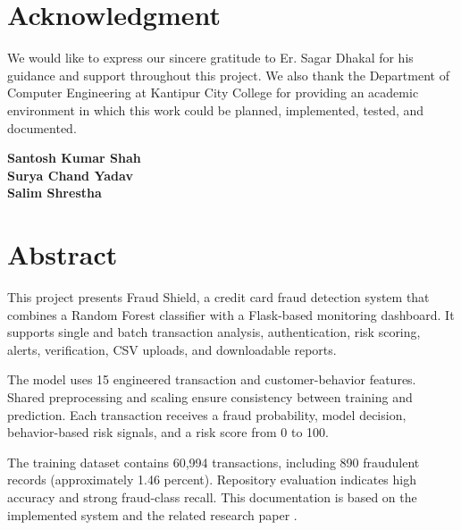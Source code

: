\documentclass[12pt,a4paper]{report}
\begin{document}
\newpage

\chapter*{Acknowledgment}

We would like to express our sincere gratitude to Er. Sagar Dhakal for his guidance and support throughout this project. We also thank the Department of Computer Engineering at Kantipur City College for providing an academic environment in which this work could be planned, implemented, tested, and documented.

\vspace{1cm}
\begin{flushright}
\textbf{Santosh Kumar Shah}\\
\textbf{Surya Chand Yadav}\\
\textbf{Salim Shrestha}
\end{flushright}

\newpage

\chapter*{Abstract}

This project presents Fraud Shield, a credit card fraud detection system that combines a Random Forest classifier with a Flask-based monitoring dashboard. It supports single and batch transaction analysis, authentication, risk scoring, alerts, verification, CSV uploads, and downloadable reports.

The model uses 15 engineered transaction and customer-behavior features. Shared preprocessing and scaling ensure consistency between training and prediction. Each transaction receives a fraud probability, model decision, behavior-based risk signals, and a risk score from 0 to 100.

The training dataset contains 60,994 transactions, including 890 fraudulent records (approximately 1.46 percent). Repository evaluation indicates high accuracy and strong fraud-class recall. This documentation is based on the implemented system and the related research paper \cite{shah2025}.

\newpage

\tableofcontents
\newpage
\end{document}
